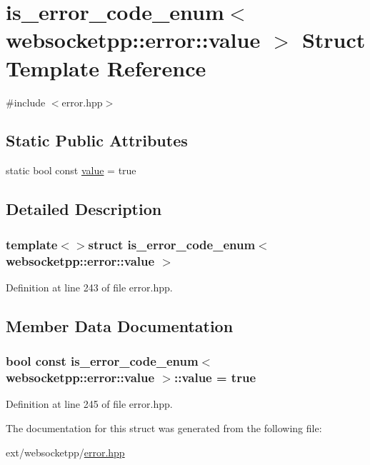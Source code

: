 \hypertarget{structis__error__code__enum_3_01websocketpp_1_1error_1_1value_01_4}{}\section{is\+\_\+error\+\_\+code\+\_\+enum$<$ websocketpp\+:\+:error\+:\+:value $>$ Struct Template Reference}
\label{structis__error__code__enum_3_01websocketpp_1_1error_1_1value_01_4}


{\ttfamily \#include $<$error.\+hpp$>$}

\subsection*{Static Public Attributes}
\begin{DoxyCompactItemize}
\item 
static bool const \hyperlink{structis__error__code__enum_3_01websocketpp_1_1error_1_1value_01_4_afe39d82e019d6303d21a6438f11fc453}{value} = true
\end{DoxyCompactItemize}


\subsection{Detailed Description}
\subsubsection*{template$<$$>$struct is\+\_\+error\+\_\+code\+\_\+enum$<$ websocketpp\+::error\+::value $>$}



Definition at line 243 of file error.\+hpp.



\subsection{Member Data Documentation}
\hypertarget{structis__error__code__enum_3_01websocketpp_1_1error_1_1value_01_4_afe39d82e019d6303d21a6438f11fc453}{}
\subsubsection[{value}]{\setlength{\rightskip}{0pt plus 5cm}bool const is\+\_\+error\+\_\+code\+\_\+enum$<$ {\bf websocketpp\+::error\+::value} $>$\+::value = true\hspace{0.3cm}{\ttfamily [static]}}\label{structis__error__code__enum_3_01websocketpp_1_1error_1_1value_01_4_afe39d82e019d6303d21a6438f11fc453}


Definition at line 245 of file error.\+hpp.



The documentation for this struct was generated from the following file\+:\begin{DoxyCompactItemize}
\item 
ext/websocketpp/\hyperlink{websocketpp_2error_8hpp}{error.\+hpp}\end{DoxyCompactItemize}
